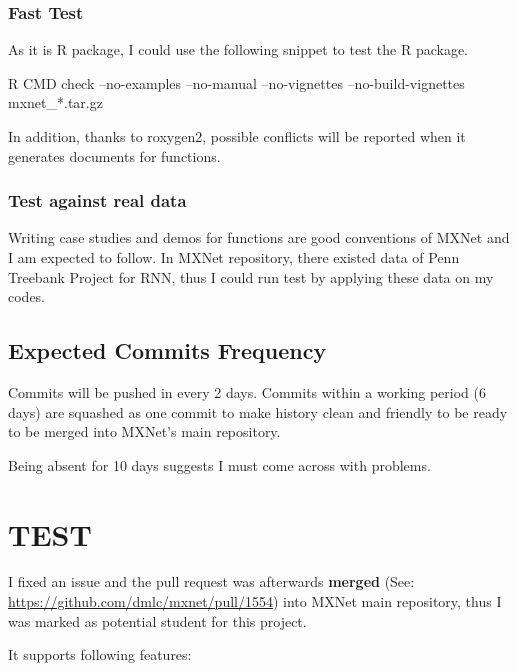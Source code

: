 \documentclass[]{article}
\newenvironment{Shaded}{\begin{snugshade}}{\end{snugshade}}
\newcommand{\NormalTok}[1]{{#1}}
\begin{document}
\subsubsection{Fast Test}\label{fast-test}

As it is R package, I could use the following snippet to test the R
package.

\begin{Shaded}
\begin{Highlighting}[]
\NormalTok{R CMD check --no-examples --no-manual --no-vignettes --no-build-vignettes mxnet_*.tar.gz}
\end{Highlighting}
\end{Shaded}

In addition, thanks to roxygen2, possible conflicts will be reported
when it generates documents for functions.

\subsubsection{Test against real data}\label{test-against-real-data}

Writing case studies and demos for functions are good conventions of
MXNet and I am expected to follow. In MXNet repository, there existed
data of Penn Treebank Project for RNN, thus I could run test by applying
these data on my codes.

\subsection{Expected Commits
Frequency}\label{expected-commits-frequency}

Commits will be pushed in every 2 days. Commits within a working period
(6 days) are squashed as one commit to make history clean and friendly
to be ready to be merged into MXNet's main repository.

Being absent for 10 days suggests I must come across with problems.

\section{TEST}\label{test}

I fixed an issue and the pull request was afterwards \textbf{merged} (See:
\url{https://github.com/dmlc/mxnet/pull/1554}) into MXNet main
repository, thus I was marked as potential student for this project.

It supports following features:
\end{document}
